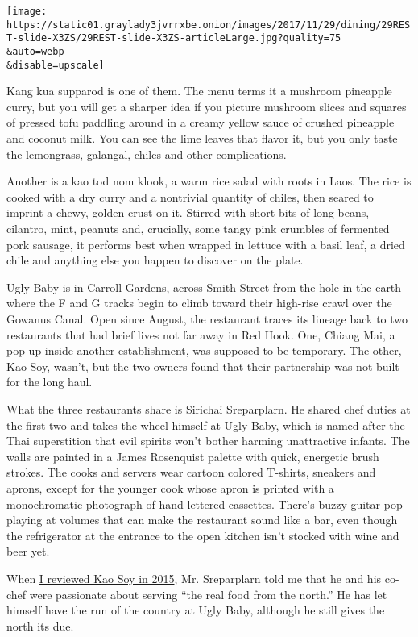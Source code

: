 \texttt{[image: https://static01.graylady3jvrrxbe.onion/images/2017/11/29/dining/29REST-slide-X3ZS/29REST-slide-X3ZS-articleLarge.jpg?quality=75\\\&auto=webp\\\&disable=upscale]}

Kang kua supparod is one of them. The menu terms it a mushroom pineapple
curry, but you will get a sharper idea if you picture mushroom slices
and squares of pressed tofu paddling around in a creamy yellow sauce of
crushed pineapple and coconut milk. You can see the lime leaves that
flavor it, but you only taste the lemongrass, galangal, chiles and other
complications.

Another is a kao tod nom klook, a warm rice salad with roots in Laos.
The rice is cooked with a dry curry and a nontrivial quantity of chiles,
then seared to imprint a chewy, golden crust on it. Stirred with short
bits of long beans, cilantro, mint, peanuts and, crucially, some tangy
pink crumbles of fermented pork sausage, it performs best when wrapped
in lettuce with a basil leaf, a dried chile and anything else you happen
to discover on the plate.

Ugly Baby is in Carroll Gardens, across Smith Street from the hole in
the earth where the F and G tracks begin to climb toward their high-rise
crawl over the Gowanus Canal. Open since August, the restaurant traces
its lineage back to two restaurants that had brief lives not far away in
Red Hook. One, Chiang Mai, a pop-up inside another establishment, was
supposed to be temporary. The other, Kao Soy, wasn't, but the two owners
found that their partnership was not built for the long haul.

What the three restaurants share is Sirichai Sreparplarn. He shared chef
duties at the first two and takes the wheel himself at Ugly Baby, which
is named after the Thai superstition that evil spirits won't bother
harming unattractive infants. The walls are painted in a James
Rosenquist palette with quick, energetic brush strokes. The cooks and
servers wear cartoon colored T-shirts, sneakers and aprons, except for
the younger cook whose apron is printed with a monochromatic photograph
of hand-lettered cassettes. There's buzzy guitar pop playing at volumes
that can make the restaurant sound like a bar, even though the
refrigerator at the entrance to the open kitchen isn't stocked with wine
and beer yet.

When
\href{https://www.nytimes3xbfgragh.onion/2015/02/11/dining/restaurant-review-kao-soy-in-red-hook-brooklyn.html}{I
reviewed Kao Soy in 2015}, Mr. Sreparplarn told me that he and his
co-chef were passionate about serving ``the real food from the north.''
He has let himself have the run of the country at Ugly Baby, although he
still gives the north its due.

